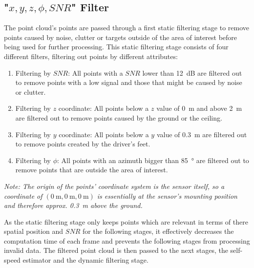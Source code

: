 \subsection{"$x,y,z,\phi,SNR$" Filter}
The point cloud's points are passed through a first static filtering stage to remove points caused by noise, clutter or targets outside of the area of interest before being used for further processing.
This static filtering stage consists of four different filters, filtering out points by different attributes:
\begin{enumerate}
    \item Filtering by $SNR$: All points with a $SNR$ lower than \SI{12}{\deci\bel} are filtered out to remove points with a low signal and those that might be caused by noise or clutter.
    \item Filtering by $z$ coordinate: All points below a $z$ value of \SI{0}{\meter} and above \SI{2}{\meter} are filtered out to remove points caused by the ground or the ceiling.
    \item Filtering by $y$ coordinate: All points below a $y$ value of \SI{0.3}{\meter} are filtered out to remove points created by the driver's feet.
    \item Filtering by $\phi$: All points with an azimuth bigger than \SI{85}{\degree} are filtered out to remove points that are outside the area of interest.
\end{enumerate}
\textit{Note: The origin of the points' coordinate system is the sensor itself, so a coordinate of $(\SI{0}{\meter},\SI{0}{\meter},\SI{0}{\meter})$ is essentially at the sensor's mounting position and therefore approx. \SI{0.3}{\meter} above the ground.}
\par
As the static filtering stage only keeps points which are relevant in terms of there spatial position and $SNR$ for the following stages, it effectively decreases the computation time of each frame and prevents the following stages from processing invalid data.
The filtered point cloud is then passed to the next stages, the self-speed estimator and the dynamic filtering stage.

